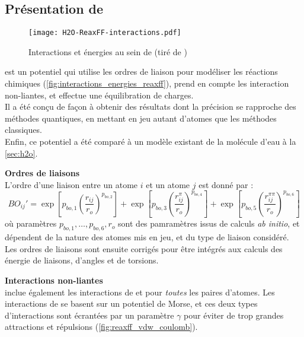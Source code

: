     \subsection{Présentation de \reaxff{}} \label{sec:reaxff}

\begin{figure}[h!]
    \centering
    \texttt{[image: H2O-ReaxFF-interactions.pdf]}
    \caption{Interactions et énergies au sein de \reaxff{} (tiré de \cite{russo_atomistic-scale_2011})}
    \label{fig:interactions_energies_reaxff}
\end{figure}

\reaxff{}\cite{russo_atomistic-scale_2011}\cite{senftle_reaxff_2016} est un potentiel qui utilise les ordres de liaison pour modéliser les réactions chimiques (\autoref{fig:interactions_energies_reaxff}), prend en compte les interaction non-liantes, et effectue  une équilibration de charges.\\
Il a été conçu de façon à obtenir des résultats dont la précision se rapproche des méthodes quantiques, en mettant en jeu autant d'atomes que les méthodes classiques.\\
Enfin, ce potentiel a été comparé à un modèle existant de la molécule d'eau à la \autoref{sec:h2o}.

\textbf{Ordres de liaisons}\\
L'ordre d'une liaison entre un atome $i$ et un atome $j$ est donné par :
\begin{equation}
    BO_{ij}' = \exp \left[p_{bo, 1} \left(\frac{r_{ij}}{r_o}\right)^{p_{bo,2}}\right] + \exp \left[p_{bo,3} \left(\frac{r_{ij}^\pi}{r_o}\right)^{p_{bo,4}}\right] + \exp \left[p_{bo,5} \left(\frac{r_{ij}^{\pi\pi}}{r_o}\right)^{p_{bo,6}}\right]
    \label{eq:ordres_liaisons_reaxff}
\end{equation}
où paramètres $p_{bo,1}, \dots, p_{bo,6}, r_o$ sont des pamramètres issus de calculs \textit{ab initio}, et dépendent de la nature des atomes mis en jeu, et du type de liaison considéré. Les ordres de liaisons sont ensuite corrigés pour être intégrés aux calculs des énergie de liaisons, d'angles et de torsions.

\textbf{Interactions non-liantes}\\
\reaxff{} inclue également les interactions de \vdw{} et \coulomb{} pour \emph{toutes} les paires d'atomes. Les interactions de \vdw{} se basent sur un potentiel de Morse, et ces deux types d'interactions sont écrantées par un paramètre $\gamma$ pour éviter de trop grandes attractions et répulsions (\autoref{fig:reaxff_vdw_coulomb}).

